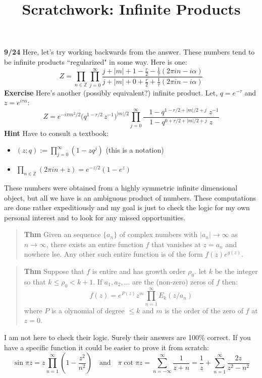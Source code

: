 \documentclass[12pt]{article}
\title{Scratchwork: Infinite Products}
\date{}
\begin{document}
\sffamily

\maketitle

\noindent \textbf{9/24} Here, let's try working backwards from the answer.  These numbers tend to be infinite products ``regularized" in some way.  Here is one:
$$ Z = \prod_{n \in \mathbb{Z}} \prod_{j=0}^\infty \frac{j+|m| + 1 - \frac{r}{2} - \frac{1}{\tau} (2\pi i n - i \alpha)}{
j+|m| + 0 + \frac{r}{2} + \frac{1}{\tau} (2\pi i n - i \alpha)} $$ 
\textbf{Exercise} Here's another (possibly equivalent?) infinite product.  Let, $q= e^{-\tau}$ and $z = e^{i\tau \alpha}$:
$$ Z = e^{-i \pi m^2/2} \big(q^{1-r/2} \, z^{-1} \big)^{|m|/2} \prod_{j=0}^{\infty} 
\frac
{  \;\;\;1 -  q^{1-r/2 +|m|/2 +j} \; z^{-1}}
{1 - q^{0+r/2 +|m|/2 +j} \; z} $$
\textbf{Hint} Have to consult a textbook: 
\begin{itemize}
\item $(z;q) := \prod_{j=0}^\infty (1 - zq^j) $ (this is a notation)
\item $\prod_{n \in \mathbb{Z}} (2\pi i n + z) = e^{-z/2} ( 1 - e^z ) $
\end{itemize}
These numbers were obtained from a highly symmetric infinite dimensional object, but all we have is an ambiguous product of numbers. These computations are done rather expeditiously and my goal is just to check the logic for my own personal interest and to look for any missed opportunities.  
\begin{quotation}\noindent \textbf{Thm} Given an sequence $\{ a_n \}$ of complex numbers with $|a_n| \to \infty$ as $n \to \infty$, there exists an entire function $f$ that vanishes at $z= a_n$ and nowhere lse.  Any other such entire function is of the form $f(z) e^{g(z)}$.\end{quotation}
\begin{quotation}\noindent \textbf{Thm} Suppose that $f$ is entire and has growth order $\rho_0$.  let $k$ be the integer so that $k \leq \rho_0 < k+1$.  If $a_1, a_2, \dots$ are the (non-zero) zeros of $f$ then:
$$ f(z) = e^{P(z)} z^m \prod_{n=1}^\infty E_k(z/a_n) $$
where $P$ is a olynomial of degree $\leq k$ and $m$ is the order of the zero of $f$ at $z = 0$.
\end{quotation}
I am not here to check their logic.  Surely their answers are 100\% correct.  If you have a specific function it could be easier to prove it from scratch:
$$ \sin \pi z = z \prod_{n=1}^\infty \left( 1 - \frac{z^2}{n^2} \right) 
\quad\text{and}\quad
\pi \cot \pi z = \sum_{n = -\infty}^\infty \frac{1}{z+n} = \frac{1}{z} + \sum_{n=1}^\infty \frac{2z}{z^2 - n^2} $$
\end{document}
